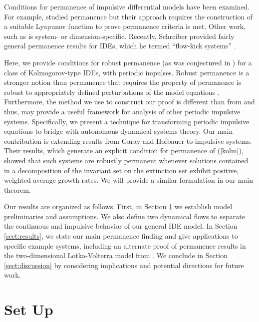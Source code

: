 \documentclass{article}
\theoremstyle{definition}
\begin{document}
Conditions for permanence of impulsive differential models have been examined. For example, \cite{ballinger_persistence_of_general_ides_1997} studied permanence but their approach requires the construction of a suitable Lyapunov function to prove permanence criteria is met. Other work, such as \cite{jin_persistence_2005} is system- or dimension-specific. Recently, Schreiber provided fairly general permanence results for IDEs, which he termed ``flow-kick systems'' \cite{schreiber_flowkick_2025}. 

Here, we provide conditions for robust permanence (as was conjectured in \cite{schreiber_flowkick_2025}) for a class of Kolmogorov-type IDEs, with periodic impulses. Robust permanence is a stronger notion than permanence that requires the property of permanence is robust to appropriately defined perturbations of the model equations \cite{garay_hofbauer_2003}. Furthermore, the method we use to construct our proof is different than from \cite{schreiber_flowkick_2025} and thus, may provide a useful framework for analysis of other periodic impulsive systems. 
Specifically, we present a technique for transforming periodic impulsive equations to bridge with autonomous dynamical systems theory. %
Our main contribution is extending results from Garay and Hofbauer \cite{garay_hofbauer_2003} to impulsive systems. Their results, which generate an explicit condition for permanence of (\ref{kolm}), showed that such systems are robustly permanent whenever solutions contained in a decomposition of the invariant set on the extinction set exhibit positive, weighted-average growth rates. We will provide a similar formulation in our main theorem.

Our results are organized as follows. First, in Section \ref{sect:setup} we establish model preliminaries and assumptions. We also define two dynamical flows to separate the continuous and impulsive behavior of our general IDE model. In Section \ref{sect:results}, we state our main permanence finding and give applications to specific example systems, including an alternate proof of permanence results in the two-dimensional Lotka-Volterra model from \cite{jin_persistence_2005}. We conclude in Section \ref{sect:discussion} by considering implications and potential directions for future work.

\section{Set Up}\label{sect:setup}
\end{document}
